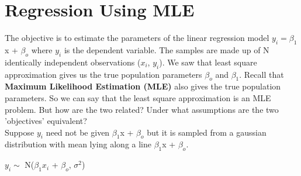 \documentclass[12pt]{article}
\begin{document}
\section{Regression Using MLE}
The objective is to estimate the parameters of the linear regression model $y_i = \beta_1$x + $\beta_o$ where $y_i$ is the dependent variable. The samples are made up of N identically independent observations ($x_i$, $y_i$). We saw that least square approximation gives us the true population parameters $\beta_o$ and $\beta_1$. Recall that \textbf{Maximum Likelihood Estimation (MLE)} also gives the true population parameters. So we can say that the least square approximation is an MLE problem. But how are the two related? Under what assumptions are the two 'objectives' equivalent?  \\
Suppose $y_{i}$ need not be given $\beta_1$x + $\beta_o$ but it is sampled from a gaussian distribution with mean lying along a line $\beta_1$x + $\beta_o$.\\
\begin{center}
    $y_i \sim$ N($\beta_1$$x_i$ + $\beta_o$, $\sigma^2$) \\
\end{center}
\end{document}

